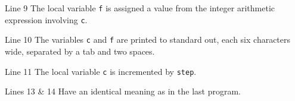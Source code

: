\documentclass[smaller,handout,table]{beamer}
\begin{document}
\begin{frame}
\begin{block}{Line 9}
The local variable {\tt f} is assigned a value from the integer arithmetic expression involving {\tt c}.
\end{block}

\begin{block}{Line 10}
The variables {\tt c} and {\tt f} are printed to standard out, each six characters
wide, separated by a tab and two spaces.
\end{block}

\begin{block}{Line 11}
The local variable {\tt c} is incremented by {\tt step}.
\end{block}

\begin{block}{Lines 13 \& 14}
Have an identical meaning as in the last program.
\end{block}

\end{frame}
\end{document}
